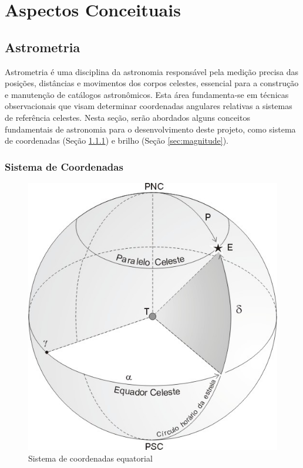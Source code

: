 \chapter{Aspectos Conceituais}
\label{cap:astronomia}



\begin{overview}
  \lipsum[1]
\end{overview}


\section{Astrometria}
\label{sec:astrometria}

Astrometria é uma disciplina da astronomia responsável pela medição precisa das posições, distâncias e movimentos dos corpos celestes, essencial para a construção e manutenção de catálogos astronômicos. Esta área fundamenta-se em técnicas observacionais que visam determinar coordenadas angulares relativas a sistemas de referência celestes. Nesta seção, serão abordados alguns conceitos fundamentais de astronomia para o desenvolvimento deste projeto, como sistema de coordenadas (Seção \ref{sec:sistema-coordenadas}) e brilho (Seção \ref{sec:magnitude}).

\subsection{Sistema de Coordenadas}
\label{sec:sistema-coordenadas}

\begin{figure}[!ht]
  \centering
  \caption{Sistema de coordenadas equatorial}
  \label{fig:sistema-equatorial}
  \includegraphics[width=0.58\linewidth]{figures/coords.png}
\end{figure}

